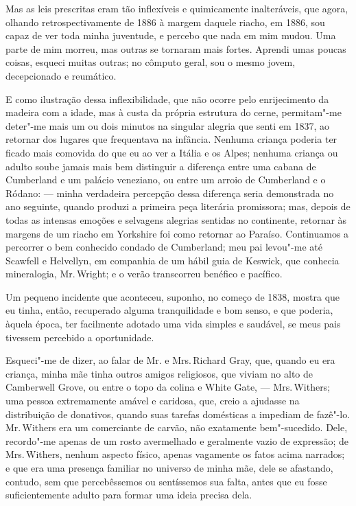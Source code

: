 Mas as leis prescritas eram tão inflexíveis e quimicamente
inalteráveis, que agora, olhando retrospectivamente de 1886 à margem
daquele riacho, em 1886, sou capaz de ver toda minha juventude, e
percebo que nada em mim mudou. Uma parte de mim morreu, mas
outras se tornaram mais fortes. Aprendi umas poucas coisas, esqueci
muitas outras; no cômputo geral, sou o mesmo jovem, decepcionado e
reumático.

E como ilustração dessa inflexibilidade, que não ocorre pelo
enrijecimento da madeira com a idade, mas à custa da própria estrutura
do cerne, permitam"-me deter"-me mais um ou dois minutos na singular
alegria que senti em 1837, ao retornar dos lugares que frequentava na
infância. Nenhuma criança poderia ter ficado mais comovida do que eu ao
ver a Itália e os Alpes; nenhuma criança ou adulto soube jamais mais bem
distinguir a diferença entre uma cabana de Cumberland e um palácio
veneziano, ou entre um arroio de Cumberland e o Ródano: --- minha
verdadeira percepção dessa diferença seria demonstrada no ano seguinte,
quando produzi a primeira peça literária promissora; mas, depois de
todas as intensas emoções e selvagens alegrias sentidas no continente,
retornar às margens de um riacho em Yorkshire foi como retornar ao
Paraíso. Continuamos a percorrer o bem conhecido condado de Cumberland;
meu pai levou"-me até Scawfell e Helvellyn, em companhia de um hábil guia
de Keswick, que conhecia mineralogia, Mr.\,Wright; e o verão transcorreu
benéfico e pacífico.

Um pequeno incidente que aconteceu, suponho, no começo de 1838,
mostra que eu tinha, então, recuperado alguma tranquilidade e bom senso,
e que poderia, àquela época, ter facilmente adotado uma vida simples e
saudável, se meus pais tivessem percebido a oportunidade.

Esqueci"-me de dizer, ao falar de Mr. e Mrs.\,Richard Gray, que, quando eu
era criança, minha mãe tinha outros amigos religiosos, que viviam no
alto de Camberwell Grove, ou entre o topo da colina e White Gate, --- Mrs.\,Withers; uma pessoa extremamente amável e caridosa, que, creio a
ajudasse na distribuição de donativos, quando suas tarefas domésticas a
impediam de fazê"-lo. Mr.\,Withers era um comerciante de carvão, não
exatamente bem"-sucedido. Dele, recordo"-me apenas de um rosto avermelhado
e geralmente vazio de expressão; de Mrs.\,Withers, nenhum aspecto físico,
apenas vagamente os fatos acima narrados; e que era uma presença
familiar no universo de minha mãe, dele se afastando, contudo, sem que
percebêssemos ou sentíssemos sua falta, antes que eu fosse
suficientemente adulto para formar uma ideia precisa dela.

